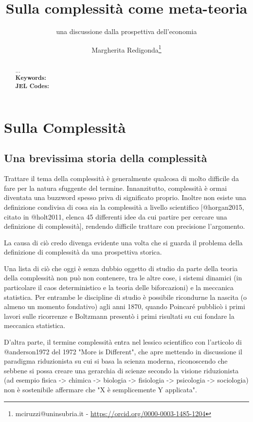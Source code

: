 \documentclass[a4paper, headings=standardclasses]{scrartcl}
\title{Sulla complessità come meta-teoria\let\thefootnote\relax\footnotetext{
		Versioni precedenti di questo lavoro sono state presentate alla 24esima ESHET Summer School e alla 2023 INEM Conference. \\
		L'ultima versione di questo lavoro è disponibile online \url{https://github.com/TnTo/complexity-economics/}.
}}
\subtitle{una discussione dalla prospettiva dell'economia}
\author{Margherita Redigonda\thanks{mciruzzi@uninsubria.it - \url{https://orcid.org/0000-0003-1485-1204}}}
\begin{document}
	
	\maketitle
	
	\begin{abstract}
		... \\
		\textbf{Keywords:} \\
		\textbf{JEL Codes:}
	\end{abstract}
	
\section{Sulla Complessità}
\subsection{Una brevissima storia della complessità}
Trattare il tema della complessità è generalmente qualcosa di molto difficile da fare per la natura sfuggente del termine. Innanzitutto, complessità è ormai diventata una buzzword spesso priva di significato proprio. Inoltre non esiste una definizione condivisa di cosa sia la complessità a livello scientifico [@horgan2015, citato in @holt2011, elenca 45 differenti idee da cui partire per cercare una definizione di complessità], rendendo difficile trattare con precisione l'argomento.

La causa di ciò credo divenga evidente una volta che si guarda il problema della definizione di complessità da una prospettiva storica. 

Una lista di ciò che oggi è senza dubbio oggetto di studio da parte della teoria della complessità non può non contenere, tra le altre cose, i sistemi dinamici (in particolare il caos deterministico e la teoria delle biforcazioni) e la meccanica statistica. Per entrambe le discipline di studio è possibile ricondurne la nascita (o almeno un momento fondativo) agli anni 1870, quando Poincaré pubblicò i primi lavori sulle ricorrenze e Boltzmann presentò i primi risultati su cui fondare la meccanica statistica.

D'altra parte, il termine complessità entra nel lessico scientifico con l'articolo di @anderson1972 del 1972 "More is Different", che apre mettendo in discussione il paradigma riduzionista su cui si basa la scienza moderna, riconoscendo che sebbene si possa creare una gerarchia di scienze secondo la visione riduzionista (ad esempio fisica -> chimica -> biologia -> fisiologia -> psicologia -> sociologia) non è sostenibile affermare che "X è semplicemente Y applicata".
\end{document}
